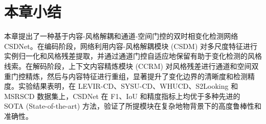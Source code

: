 \section{本章小结}

本章提出了一种基于内容-风格解耦和通道-空间门控的双时相变化检测网络 CSDNet。在编码阶段，网络利用内容-风格解耦模块 (CSDM) 对多尺度特征进行实例归一化和风格残差提取，并通过通道门控自适应地保留有助于变化检测的风格线索。在解码阶段，上下文内容精炼模块 (CCRM) 对风格残差进行通道和空间双重门控精炼，然后与内容特征进行重组，显著提升了变化边界的清晰度和检测精度。实验结果表明，在 LEVIR-CD、SYSU-CD、WHUCD、S2Looking 和 MSRSCD 数据集上，CSDNet 在 F1、IoU 和精度指标上均优于多种先进的 SOTA (State-of-the-art) 方法，验证了所提模块在复杂地物背景下的高度鲁棒性和准确性。
